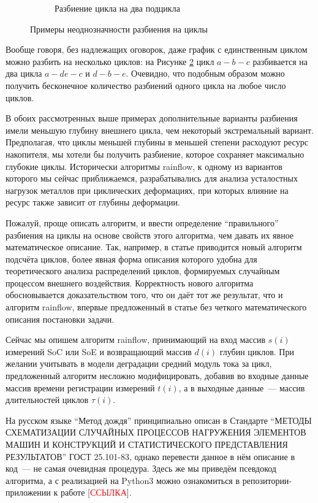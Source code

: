 \documentclass{report}
\begin{document}
\begin{enumerate}
\begin{figure}[]
\begin{subfigure}[b]{0.45\textwidth}
\caption{Разбиение цикла на два подцикла}
\label{fig:one-cycle}
\end{subfigure}
\caption{Примеры неоднозначности разбиения на циклы}
\end{figure}

Вообще говоря, без надлежащих оговорок, даже график с единственным циклом можно разбить на несколько циклов: на Рисунке \ref{fig:one-cycle} цикл $a-b-c$ разбивается на два цикла $a-de-c$ и $d-b-e$.
Очевидно, что подобным образом можно получить бесконечное количество разбиений одного цикла на любое число циклов.

В обоих рассмотренных выше примерах дополнительные варианты разбиения имели меньшую глубину внешнего цикла, чем некоторый экстремальный вариант.
Предполагая, что циклы меньшей глубины в меньшей степени расходуют ресурс накопителя, мы хотели бы получить разбиение, которое сохраняет максимально глубокие циклы.
Исторически алгоритмы rainflow, к одному из вариантов которого мы сейчас приближаемся, разрабатывались для анализа усталостных нагрузок металлов при циклических деформациях, при которых влияние на ресурс также зависит от глубины деформации.

Пожалуй, проще описать алгоритм, и ввести определение ``правильного'' разбиения на циклы на основе свойств этого алгоритма, чем давать их явное математическое описание.
Так, например, в статье \cite{rychlik1987new} приводится новый алгоритм подсчёта циклов, более явная форма описания которого удобна для теоретического анализа распределений циклов, формируемых случайным процессом внешнего воздействия.
Корректность нового алгоритма обосновывается доказательством того, что он даёт тот же результат, что и алгоритм rainflow, впервые предложенный в статье \cite{matsuishi1968fatigue} без четкого математического описания постановки задачи.

Сейчас мы опишем алгоритм rainflow, принимающий на вход массив $s(i)$ измерений SoC или SoE и возвращающий массив $d(i)$ глубин циклов.
При желании учитывать в модели деградации средний модуль тока за цикл, предложенный алгоритм несложно модифицировать, добавив во входные данные массив времени регистрации измерений $t(i)$, а в выходные данные~--- массив длительностей циклов $\tau(i)$.

На русском языке ``Метод дождя'' принципиально описан в Стандарте 
``МЕТОДЫ СХЕМАТИЗАЦИИ СЛУЧАЙНЫХ ПРОЦЕССОВ НАГРУЖЕНИЯ ЭЛЕМЕНТОВ МАШИН И КОНСТРУКЦИЙ И СТАТИСТИЧЕСКОГО ПРЕДСТАВЛЕНИЯ РЕЗУЛЬТАТОВ'' 
ГОСТ 25.101-83, однако перевести данное в нём описание в код~--- не самая очевидная процедура.
Здесь же мы приведём псевдокод алгоритма, а с реализацией на Python3 можно ознакомиться в репозитории-приложении к работе [\textcolor{red}{ССЫЛКА}].


\end{enumerate}
\end{document}
